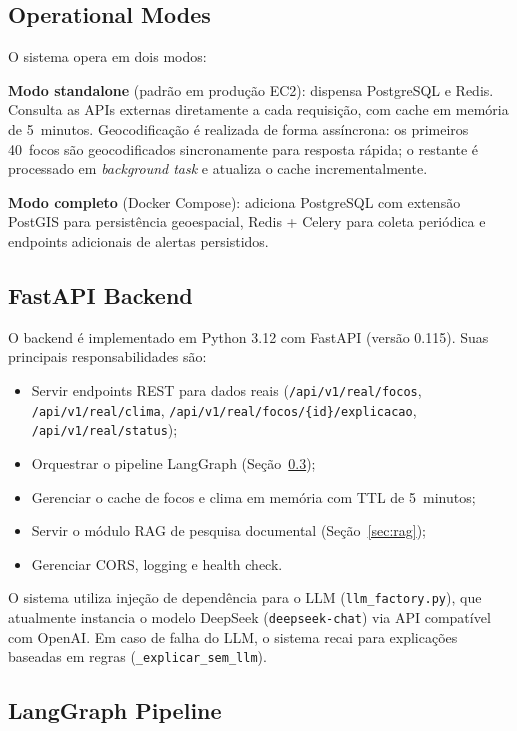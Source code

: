 \documentclass[preprint,times,numbers]{elsarticle}
\begin{document}
\subsection{Operational Modes}
\label{sec:modes}

O sistema opera em dois modos:

\textbf{Modo standalone} (padrão em produção EC2): dispensa PostgreSQL e Redis. Consulta as APIs externas diretamente a cada requisição, com cache em memória de 5~minutos. Geocodificação é realizada de forma assíncrona: os primeiros 40~focos são geocodificados sincronamente para resposta rápida; o restante é processado em \emph{background task} e atualiza o cache incrementalmente.

\textbf{Modo completo} (Docker Compose): adiciona PostgreSQL com extensão PostGIS para persistência geoespacial, Redis + Celery para coleta periódica e endpoints adicionais de alertas persistidos.

\subsection{FastAPI Backend}
\label{sec:backend}

O backend é implementado em Python 3.12 com FastAPI (versão 0.115). Suas principais responsabilidades são:

\begin{itemize}
    \item Servir endpoints REST para dados reais (\texttt{/api/v1/real/focos}, \texttt{/api/v1/real/clima}, \texttt{/api/v1/real/focos/\{id\}/explicacao}, \texttt{/api/v1/real/status});
    \item Orquestrar o pipeline LangGraph (Seção~\ref{sec:langgraph});
    \item Gerenciar o cache de focos e clima em memória com TTL de 5~minutos;
    \item Servir o módulo RAG de pesquisa documental (Seção~\ref{sec:rag});
    \item Gerenciar CORS, logging e health check.
\end{itemize}

O sistema utiliza injeção de dependência para o LLM (\texttt{llm\_factory.py}), que atualmente instancia o modelo DeepSeek (\texttt{deepseek-chat}) via API compatível com OpenAI. Em caso de falha do LLM, o sistema recai para explicações baseadas em regras (\texttt{\_explicar\_sem\_llm}).

\subsection{LangGraph Pipeline}
\label{sec:langgraph}
\end{document}
